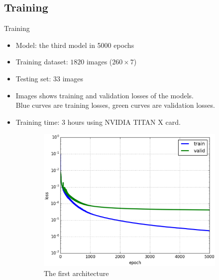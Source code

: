 \documentclass[10pt]{beamer}
\begin{document}
\subsection{Training}
\begin{frame}{Training}{}
	\begin{itemize}
		\item Model: the third model in 5000 epochs\footnotemark
		\item Training dataset: $1820$ images ($260 \times 7$)
		\item Testing set: $33$ images
		\item Images shows training and validation losses of the models.\\ \small{{\color{blue}Blue} curves are training losses, {\color{green}green} curves are validation losses.}
		\item Training time: 3 hours using NVIDIA TITAN X card.
	\end{itemize}
	\begin{figure}[htbp]
   				\begin{subfigure}[t]{0.5\textwidth}
        			\centering
        			\includegraphics[scale=.2]{images/loss_model_1}
        			\caption{\scriptsize{The first architecture}}
        			\label{figsub11}
    			\end{subfigure}%
    			~ 
    			\begin{subfigure}[t]{0.5\textwidth}
        			\centering

\end{subfigure}
\end{figure}
\end{frame}
\end{document}
